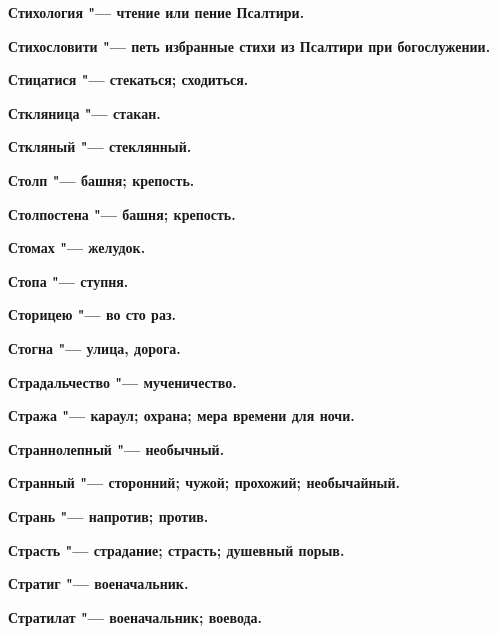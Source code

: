 \bfseries Стихология \normalfont{} "--- чтение или пение Псалтири. 




\bfseries Стихословити \normalfont{} "--- петь избранные стихи из Псалтири при богослужении. 




\bfseries Стицатися \normalfont{} "--- стекаться; сходиться. 




\bfseries Сткляница \normalfont{} "--- стакан. 




\bfseries Сткляный \normalfont{} "--- стеклянный. 




\bfseries Столп \normalfont{} "--- башня; крепость. 




\bfseries Столпостена \normalfont{} "--- башня; крепость. 




\bfseries Стомах \normalfont{} "--- желудок. 




\bfseries Стопа \normalfont{} "--- ступня. 




\bfseries Сторицею \normalfont{} "--- во сто раз. 




\bfseries Стогна \normalfont{} "--- улица, дорога. 




\bfseries Страдальчество \normalfont{} "--- мученичество. 




\bfseries Стража \normalfont{} "--- караул; охрана; мера времени для ночи. 




\bfseries Страннолепный \normalfont{} "--- необычный. 




\bfseries Странный \normalfont{} "--- сторонний; чужой; прохожий; необычайный. 




\bfseries Странь \normalfont{} "--- напротив; против. 




\bfseries Страсть \normalfont{} "--- страдание; страсть; душевный порыв. 




\bfseries Стратиг \normalfont{} "--- военачальник. 




\bfseries Стратилат \normalfont{} "--- военачальник; воевода. 




